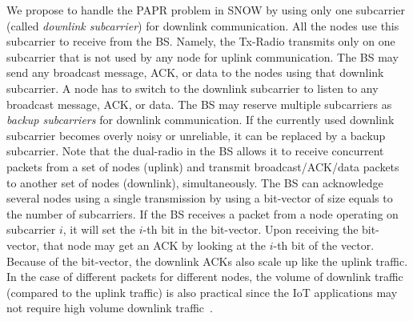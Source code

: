 We propose to handle the PAPR problem in SNOW by using only one subcarrier (called {\em downlink subcarrier}) for downlink communication. All the nodes use this subcarrier to receive from the BS. Namely, the Tx-Radio transmits only on one subcarrier that is not used by any node for uplink communication.
The BS may send any broadcast message, ACK, or data to the nodes using that downlink subcarrier. A node has to switch to the downlink subcarrier to listen to any broadcast message, ACK, or data.
The BS may reserve multiple subcarriers  as {\slshape backup subcarriers} for downlink communication. 
If the currently used downlink subcarrier becomes overly noisy or unreliable, it can be replaced by a backup subcarrier.
Note that the dual-radio in the BS allows it to receive concurrent packets from a set of nodes (uplink) and transmit broadcast/ACK/data packets to another set of nodes (downlink), simultaneously. 
The BS can acknowledge several nodes using a single transmission by using a bit-vector of size equals to the number of subcarriers.
If the BS receives a packet from a node operating on subcarrier $i$, it will set the $i$-th bit in the bit-vector. Upon receiving the bit-vector, that node may get an ACK by looking at the $i$-th bit of the vector. Because of the bit-vector, the downlink ACKs also scale up like the uplink traffic. In the case of different packets for different nodes, the volume of downlink traffic (compared to the uplink traffic) is also practical since the IoT applications may not require high volume downlink traffic~\cite{whitespaceSurvey}.



